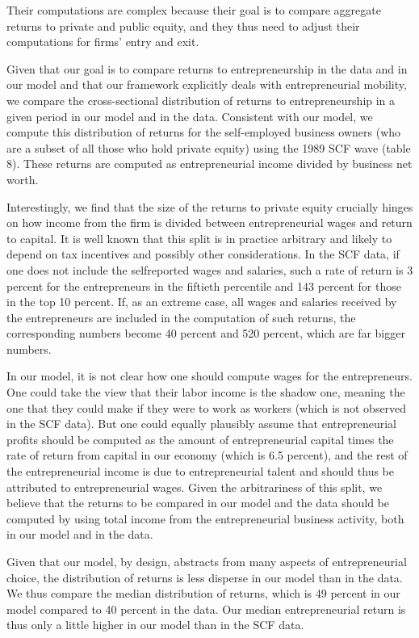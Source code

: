 \documentclass[10pt]{article}
\begin{document}
Their computations are complex because their goal is to compare aggregate returns to private and public equity, and they thus need to adjust their computations for firms' entry and exit.

Given that our goal is to compare returns to entrepreneurship in the data and in our model and that our framework explicitly deals with entrepreneurial mobility, we compare the cross-sectional distribution of returns to entrepreneurship in a given period in our model and in the data. Consistent with our model, we compute this distribution of returns for the self-employed business owners (who are a subset of all those who hold private equity) using the 1989 SCF wave (table 8). These returns are computed as entrepreneurial income divided by business net worth.

Interestingly, we find that the size of the returns to private equity crucially hinges on how income from the firm is divided between entrepreneurial wages and return to capital. It is well known that this split is in practice arbitrary and likely to depend on tax incentives and possibly other considerations. In the SCF data, if one does not include the selfreported wages and salaries, such a rate of return is 3 percent for the entrepreneurs in the fiftieth percentile and 143 percent for those in the top 10 percent. If, as an extreme case, all wages and salaries received by the entrepreneurs are included in the computation of such returns, the corresponding numbers become 40 percent and 520 percent, which are far bigger numbers.

In our model, it is not clear how one should compute wages for the entrepreneurs. One could take the view that their labor income is the shadow one, meaning the one that they could make if they were to work as workers (which is not observed in the SCF data). But one could equally plausibly assume that entrepreneurial profits should be computed as the amount of entrepreneurial capital times the rate of return from capital in our economy (which is 6.5 percent), and the rest of the entrepreneurial income is due to entrepreneurial talent and should thus be attributed to entrepreneurial wages. Given the arbitrariness of this split, we believe that the returns to be compared in our model and the data should be computed by using total income from the entrepreneurial business activity, both in our model and in the data.

Given that our model, by design, abstracts from many aspects of entrepreneurial choice, the distribution of returns is less disperse in our model than in the data. We thus compare the median distribution of returns, which is 49 percent in our model compared to 40 percent in the data. Our median entrepreneurial return is thus only a little higher in our model than in the SCF data.
\end{document}

